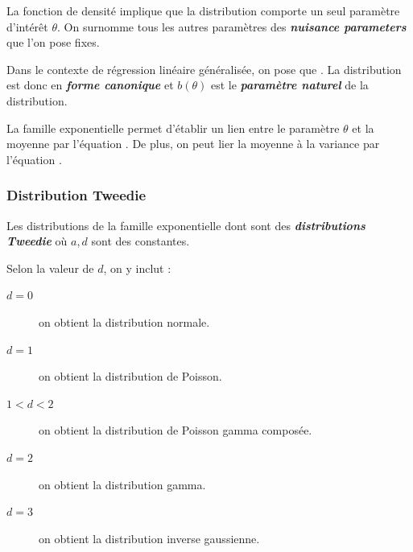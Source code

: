 \documentclass[french]{article}
\begin{document}
\begin{multicols*}{2}
\begin{definitionNOHFILL}
\bigskip

La fonction de densité implique que la distribution comporte un seul paramètre d'intérêt $\theta$. On surnomme tous les autres paramètres des \og \textit{\textbf{nuisance parameters}} \fg{} que l'on pose fixes.

\bigskip

\begin{definitionNOHFILLsub}
Dans le contexte de régression linéaire généralisée, on pose que . La distribution est donc en \textbf{\textit{forme canonique}} et $b(\theta)$ est le \textbf{\textit{paramètre naturel}} de la distribution.
\end{definitionNOHFILLsub}

\begin{definitionNOHFILLprop}
La famille exponentielle permet d'établir un lien entre le paramètre $\theta$ et la moyenne par l'équation . De plus, on peut lier la moyenne à la variance par l'équation .
\end{definitionNOHFILLprop}
\end{definitionNOHFILL}



\subsubsection{Distribution Tweedie}
Les distributions de la famille exponentielle dont  sont des \textit{\textbf{distributions Tweedie}} où $a, d$ sont des constantes.

Selon la valeur de $d$, on y inclut :
\begin{description}
	\item[$d = 0$]	on obtient la distribution normale.
	\item[$d = 1$]	on obtient la distribution de Poisson.
	\item[$1 < d < 2$]	on obtient la distribution de Poisson gamma composée.
	\item[$d = 2$]	on obtient la distribution gamma.
	\item[$d = 3$]	on obtient la distribution inverse gaussienne.
\end{description}

\bigskip


\end{multicols*}
\end{document}
